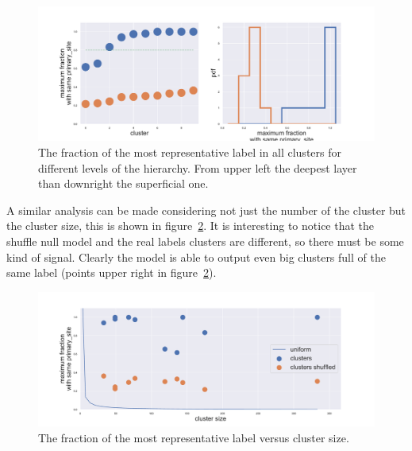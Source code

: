 \begin{figure}[htb!]
\begin{minipage}{0.45\textwidth}
    \end{minipage}
    \hspace{3mm}
    \begin{minipage}{0.45\textwidth}
    \includegraphics[width=0.85\linewidth]{pictures/topic/gtex/oversigma_10tissue/shuffledcluster_maximum_l3_primary_site.pdf}
    \end{minipage}
    \caption{The fraction of the most representative label in all clusters for different levels of the hierarchy. From upper left the deepest layer than downright the superficial one.}
    \label{fig:topic/gtex/oversigma_10tissue/shuffledcluster_maximum*}
\end{figure}
\FloatBarrier
A similar analysis can be made considering not just the number of the cluster but the cluster size, this is shown in figure~\ref{fig:topic/gtex/oversigma_10tissue/shuffledclusterhomosize_l3_primary_site}. It is interesting to notice that the shuffle null model and the real labels clusters are different, so there must be some kind of signal. Clearly the model is able to output even big clusters full of the same label (points upper right in figure~\ref{fig:topic/gtex/oversigma_10tissue/shuffledclusterhomosize_l3_primary_site}).
\begin{figure}[htb!]
	\centering
	\includegraphics[width=0.9\linewidth]{pictures/topic/gtex/oversigma_10tissue/shuffledclusterhomosize_l3_primary_site.pdf}
	\caption{The fraction of the most representative label versus cluster size.}
	\label{fig:topic/gtex/oversigma_10tissue/shuffledclusterhomosize_l3_primary_site}
\end{figure}
